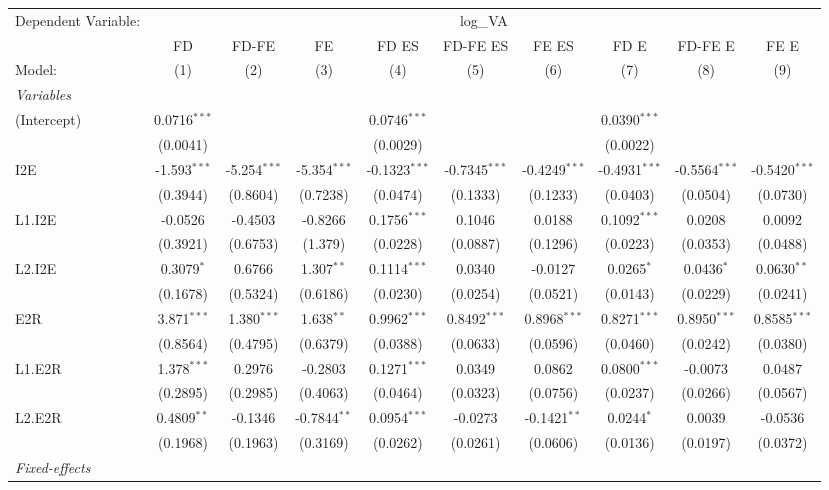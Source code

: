 \begin{tabular}{lccccccccc}
Dependent Variable:&\multicolumn{9}{c}{log\_VA}\\
  & FD & FD-FE & FE & FD ES & FD-FE ES & FE ES & FD E & FD-FE E & FE E\\
Model:&(1) & (2) & (3) & (4) & (5) & (6) & (7) & (8) & (9)\\
\midrule \emph{Variables}&   &   &   &   &   &   &   &   &  \\
(Intercept)&0.0716$^{***}$ &    &    & 0.0746$^{***}$ &    &    & 0.0390$^{***}$ &    &   \\
  &(0.0041) &    &    & (0.0029) &    &    & (0.0022) &    &   \\
I2E&-1.593$^{***}$ & -5.254$^{***}$ & -5.354$^{***}$ & -0.1323$^{***}$ & -0.7345$^{***}$ & -0.4249$^{***}$ & -0.4931$^{***}$ & -0.5564$^{***}$ & -0.5420$^{***}$\\
  &(0.3944) & (0.8604) & (0.7238) & (0.0474) & (0.1333) & (0.1233) & (0.0403) & (0.0504) & (0.0730)\\
L1.I2E&-0.0526 & -0.4503 & -0.8266 & 0.1756$^{***}$ & 0.1046 & 0.0188 & 0.1092$^{***}$ & 0.0208 & 0.0092\\
  &(0.3921) & (0.6753) & (1.379) & (0.0228) & (0.0887) & (0.1296) & (0.0223) & (0.0353) & (0.0488)\\
L2.I2E&0.3079$^{*}$ & 0.6766 & 1.307$^{**}$ & 0.1114$^{***}$ & 0.0340 & -0.0127 & 0.0265$^{*}$ & 0.0436$^{*}$ & 0.0630$^{**}$\\
  &(0.1678) & (0.5324) & (0.6186) & (0.0230) & (0.0254) & (0.0521) & (0.0143) & (0.0229) & (0.0241)\\
E2R&3.871$^{***}$ & 1.380$^{***}$ & 1.638$^{**}$ & 0.9962$^{***}$ & 0.8492$^{***}$ & 0.8968$^{***}$ & 0.8271$^{***}$ & 0.8950$^{***}$ & 0.8585$^{***}$\\
  &(0.8564) & (0.4795) & (0.6379) & (0.0388) & (0.0633) & (0.0596) & (0.0460) & (0.0242) & (0.0380)\\
L1.E2R&1.378$^{***}$ & 0.2976 & -0.2803 & 0.1271$^{***}$ & 0.0349 & 0.0862 & 0.0800$^{***}$ & -0.0073 & 0.0487\\
  &(0.2895) & (0.2985) & (0.4063) & (0.0464) & (0.0323) & (0.0756) & (0.0237) & (0.0266) & (0.0567)\\
L2.E2R&0.4809$^{**}$ & -0.1346 & -0.7844$^{**}$ & 0.0954$^{***}$ & -0.0273 & -0.1421$^{**}$ & 0.0244$^{*}$ & 0.0039 & -0.0536\\
  &(0.1968) & (0.1963) & (0.3169) & (0.0262) & (0.0261) & (0.0606) & (0.0136) & (0.0197) & (0.0372)\\
\midrule \emph{Fixed-effects}&   &   &   &   &   &   &   &   &  \\

\end{tabular}
